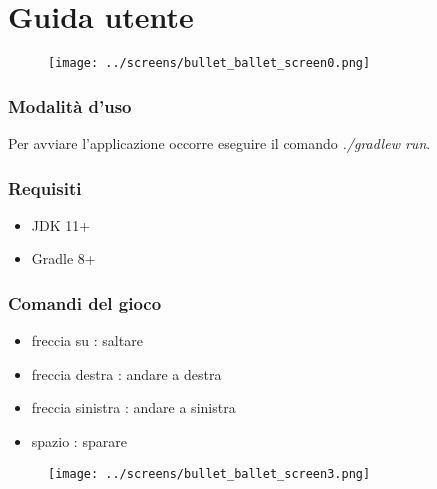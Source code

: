 
\appendix
\chapter{Guida utente}

\begin{figure}[H]
	\centering{}
	\texttt{[image: ../screens/bullet\_ballet\_screen0.png]}
	\label{img:bullet_ballet_screen0}
\end{figure}

\subsection{Modalità d'uso}

\textsf{\small Per avviare l'applicazione occorre eseguire il comando \emph{./gradlew run}.} \\

\subsection{Requisiti}

\begin{itemize}
	\item \textsf{\small JDK 11+}
	\item \textsf{\small Gradle 8+}
\end{itemize}

\subsection{Comandi del gioco}

\begin{itemize}
	\item \textsf{\small freccia su : saltare}
	\item \textsf{\small freccia destra : andare a destra}
	\item \textsf{\small freccia sinistra : andare a sinistra}
	\item \textsf{\small spazio : sparare}
\end{itemize}

\begin{figure}[H]
	\centering{}
	\texttt{[image: ../screens/bullet\_ballet\_screen3.png]}
	\label{img:bullet_ballet_screen3}
\end{figure}

